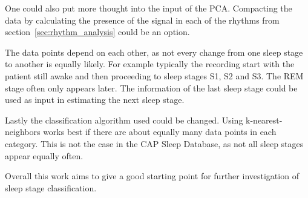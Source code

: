 One could also put more thought into the input of the PCA. Compacting the data by calculating the presence of the signal in each of the rhythms from section~\ref{sec:rhythm_analysis} could be an option.

The data points depend on each other, as not every change from one sleep stage to another is equally likely. For example typically the recording start with the patient still awake and then proceeding to sleep stages S1, S2 and S3. The REM stage often only appears later. The information of the last sleep stage could be used as input in estimating the next sleep stage.

Lastly the classification algorithm used could be changed. Using k-nearest-neighbors works best if there are about equally many data points in each category. This is not the case in the CAP Sleep Database, as not all sleep stages appear equally often.

Overall this work aims to give a good starting point for further investigation of sleep stage classification.